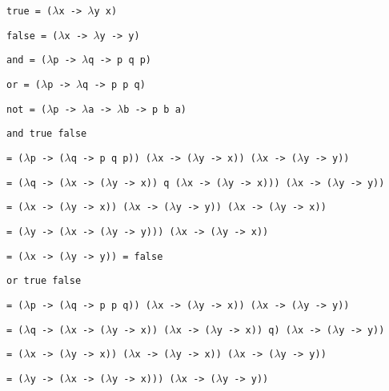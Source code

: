 \documentclass[11pt]{article}
\begin{document}
\hspace{2cm}\texttt{true = ($\lambda$x -> $\lambda$y x)}

\hspace{2cm}\texttt{false = ($\lambda$x -> $\lambda$y -> y)}

\hspace{2cm}\texttt{and = ($\lambda$p -> $\lambda$q -> p q p)}

\hspace{2cm}\texttt{or = ($\lambda$p -> $\lambda$q -> p p q)}

\hspace{2cm}\texttt{not = ($\lambda$p -> $\lambda$a -> $\lambda$b -> p b a)}

\hspace{2cm}\texttt{and true false}

\hspace{2.5cm}\texttt{= ($\lambda$p -> ($\lambda$q -> p q p)) ($\lambda$x -> ($\lambda$y -> x)) ($\lambda$x -> ($\lambda$y -> y))}

\hspace{2.5cm}\texttt{= ($\lambda$q -> ($\lambda$x -> ($\lambda$y -> x)) q ($\lambda$x -> ($\lambda$y -> x))) ($\lambda$x -> ($\lambda$y -> y))}

\hspace{2.5cm}\texttt{= ($\lambda$x -> ($\lambda$y -> x)) ($\lambda$x -> ($\lambda$y -> y)) ($\lambda$x -> ($\lambda$y -> x))}

\hspace{2.5cm}\texttt{= ($\lambda$y -> ($\lambda$x -> ($\lambda$y -> y))) ($\lambda$x -> ($\lambda$y -> x))}

\hspace{2.5cm}\texttt{= ($\lambda$x -> ($\lambda$y -> y)) = false}
\medskip 

\hspace{2cm}\texttt{or true false}

\hspace{2.5cm}\texttt{= ($\lambda$p -> ($\lambda$q -> p p q)) ($\lambda$x -> ($\lambda$y -> x)) ($\lambda$x -> ($\lambda$y -> y))}

\hspace{2.5cm}\texttt{= ($\lambda$q -> ($\lambda$x -> ($\lambda$y -> x)) ($\lambda$x -> ($\lambda$y -> x)) q) ($\lambda$x -> ($\lambda$y -> y))}

\hspace{2.5cm}\texttt{= ($\lambda$x -> ($\lambda$y -> x)) ($\lambda$x -> ($\lambda$y -> x)) ($\lambda$x -> ($\lambda$y -> y))}

\hspace{2.5cm}\texttt{= ($\lambda$y -> ($\lambda$x -> ($\lambda$y -> x))) ($\lambda$x -> ($\lambda$y -> y))}
\end{document}
